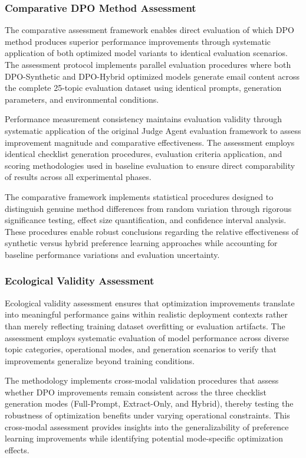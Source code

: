 \subsubsection{Comparative DPO Method Assessment}

The comparative assessment framework enables direct evaluation of which DPO method produces superior performance improvements through systematic application of both optimized model variants to identical evaluation scenarios. The assessment protocol implements parallel evaluation procedures where both DPO-Synthetic and DPO-Hybrid optimized models generate email content across the complete 25-topic evaluation dataset using identical prompts, generation parameters, and environmental conditions.

Performance measurement consistency maintains evaluation validity through systematic application of the original Judge Agent evaluation framework to assess improvement magnitude and comparative effectiveness. The assessment employs identical checklist generation procedures, evaluation criteria application, and scoring methodologies used in baseline evaluation to ensure direct comparability of results across all experimental phases.

The comparative framework implements statistical procedures designed to distinguish genuine method differences from random variation through rigorous significance testing, effect size quantification, and confidence interval analysis. These procedures enable robust conclusions regarding the relative effectiveness of synthetic versus hybrid preference learning approaches while accounting for baseline performance variations and evaluation uncertainty.

\subsubsection{Ecological Validity Assessment}

Ecological validity assessment ensures that optimization improvements translate into meaningful performance gains within realistic deployment contexts rather than merely reflecting training dataset overfitting or evaluation artifacts. The assessment employs systematic evaluation of model performance across diverse topic categories, operational modes, and generation scenarios to verify that improvements generalize beyond training conditions.

The methodology implements cross-modal validation procedures that assess whether DPO improvements remain consistent across the three checklist generation modes (Full-Prompt, Extract-Only, and Hybrid), thereby testing the robustness of optimization benefits under varying operational constraints. This cross-modal assessment provides insights into the generalizability of preference learning improvements while identifying potential mode-specific optimization effects.

